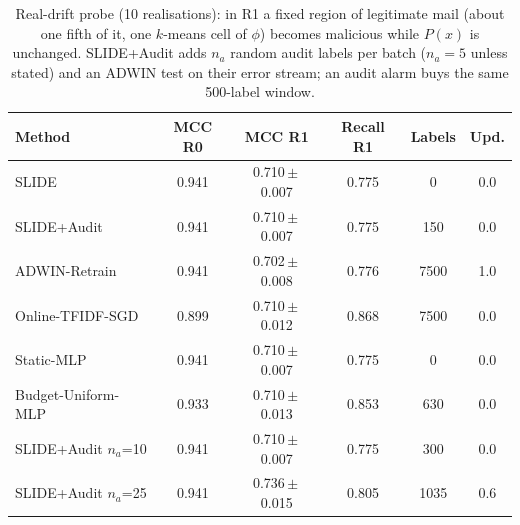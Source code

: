 \begin{table}[t]
\centering
\caption{Real-drift probe (10 realisations): in R1 a fixed region of legitimate mail (about one fifth of it, one $k$-means cell of $\phi$) becomes malicious while $P(x)$ is unchanged. SLIDE+Audit adds $n_a$ random audit labels per batch ($n_a=5$ unless stated) and an ADWIN test on their error stream; an audit alarm buys the same 500-label window.}
\label{tab:rev-real}
\scriptsize
\setlength{\tabcolsep}{3pt}
\begin{tabular}{@{}lccccc@{}}
\toprule
Method & MCC R0 & MCC R1 & Recall R1 & Labels & Upd. \\
\midrule
SLIDE & 0.941 & 0.710\,$\pm$\,0.007 & 0.775 & 0 & 0.0 \\
SLIDE+Audit & 0.941 & 0.710\,$\pm$\,0.007 & 0.775 & 150 & 0.0 \\
ADWIN-Retrain & 0.941 & 0.702\,$\pm$\,0.008 & 0.776 & 7500 & 1.0 \\
Online-TFIDF-SGD & 0.899 & 0.710\,$\pm$\,0.012 & 0.868 & 7500 & 0.0 \\
Static-MLP & 0.941 & 0.710\,$\pm$\,0.007 & 0.775 & 0 & 0.0 \\
Budget-Uniform-MLP & 0.933 & 0.710\,$\pm$\,0.013 & 0.853 & 630 & 0.0 \\
SLIDE+Audit $n_a$=10 & 0.941 & 0.710\,$\pm$\,0.007 & 0.775 & 300 & 0.0 \\
SLIDE+Audit $n_a$=25 & 0.941 & 0.736\,$\pm$\,0.015 & 0.805 & 1035 & 0.6 \\
\bottomrule
\end{tabular}
\end{table}
